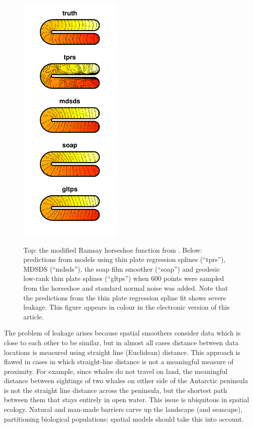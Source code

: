 \documentclass[smallextended]{svjour3}       %
\begin{document}
\begin{figure}
\centering
\includegraphics[width=0.45\textwidth]{examples/ramsay/ramsay-real.pdf}\\
\caption{Top: the modified Ramsay horseshoe function from \protect\cite{Wood:2008vo}. Below: predictions from models using thin plate regression splines (``tprs''), MDSDS (``mdsds''), the soap film smoother (``soap'') and geodesic low-rank thin plate splines (``gltps'') when 600 points were sampled from the horseshoe and standard normal noise was added. Note that the predictions from the thin plate regression spline fit shows severe leakage. This figure appears in colour in the electronic version of this article.
\label{leakage}}
\end{figure}


The problem of leakage arises because spatial smoothers consider data which is close to each other to be similar, but in almost all cases distance between data locations is measured using straight line (Euclidean) distance. This approach is flawed in cases in which straight-line distance is not a meaningful measure of proximity. For example, since whales do not travel on land, the meaningful distance between sightings of two whales on either side of the Antarctic peninsula is not the straight line distance across the peninsula, but the shortest path between them that stays entirely in open water. This issue is ubiquitous in spatial ecology. Natural and man-made barriers carve up the landscape (and seascape), partitioning biological populations; spatial models should take this into account. 
\end{document}
